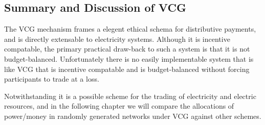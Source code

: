 




\subsection{Summary and Discussion of VCG}\label{subsec:summary_discussion_VCG}

The VCG mechanism frames a elegent ethical schema for distributive payments, and is directly extensable to electricity systems.
Although it is incentive compatable, the primary practical draw-back to such a system is that it is not budget-balanced.
Unfortunately there is no easily implementable system that is like VCG that is incentive compatable and is budget-balanced without forcing participants to trade at a loss.

Notwithstanding it is a possible scheme for the trading of electricity and electric resources, and in the following chapter we will compare the allocations of power/money in randomly generated networks under VCG against other schemes.

